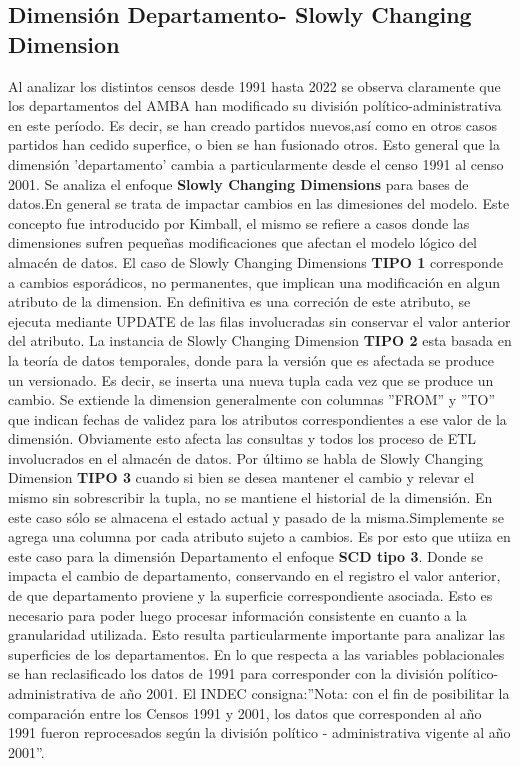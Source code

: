 \documentclass{article}
\theoremstyle{mytheoremstyle}
\theoremstyle{mytheoremstyle}
\theoremstyle{myproblemstyle}
\begin{document}
 \subsection{Dimensión Departamento- Slowly Changing Dimension }
 Al analizar los distintos censos desde 1991 hasta 2022 se observa claramente que los departamentos del 
 AMBA han modificado su división político-administrativa en este período.
  Es decir, se han creado partidos nuevos,así como en otros casos partidos han cedido superfice, o bien se han fusionado otros.
  Esto general que la dimensión 'departamento' cambia a particularmente desde el censo 1991 al censo 2001.\newline
  Se analiza el enfoque \textbf{Slowly Changing Dimensions} para bases de datos.En general se trata de impactar cambios
   en las dimesiones del modelo. Este concepto fue introducido por Kimball, el mismo se
   refiere a casos donde las dimensiones sufren pequeñas modificaciones que afectan el modelo lógico del almacén de datos.\newline
  El caso de Slowly Changing Dimensions \textbf{TIPO 1} corresponde a cambios esporádicos, no permanentes,
   que implican una modificación en algun atributo de la dimension. En definitiva es una correción de este atributo, 
  se ejecuta mediante UPDATE de las filas involucradas sin conservar el valor anterior del atributo.
  La instancia de Slowly Changing Dimension \textbf{TIPO 2} esta basada en la teoría de datos temporales,
   donde para la versión que es afectada se produce un versionado.
  Es decir, se inserta una nueva tupla cada vez que se produce un cambio. Se extiende la dimension generalmente con columnas
   ''FROM'' y ''TO'' que indican  fechas de validez para los atributos correspondientes a ese valor de la dimensión.
    Obviamente esto afecta las consultas y todos los proceso  de ETL involucrados en el almacén de datos. 
  Por último se habla de  Slowly Changing Dimension \textbf{TIPO 3} cuando si bien se desea mantener el cambio y 
  relevar el mismo sin sobrescribir la tupla, no se mantiene el historial de la dimensión.
  En este caso sólo se almacena el estado actual y pasado de la misma.Simplemente se agrega una columna
  por cada atributo sujeto a cambios.\newline
  Es por esto que utiiza en este caso para la dimensión Departamento el enfoque \textbf{SCD tipo 3}. Donde se impacta el 
  cambio de departamento, conservando en el registro el valor anterior, de que departamento proviene y 
  la superficie correspondiente asociada. Esto es necesario para poder luego procesar información consistente 
  en cuanto a la granularidad utilizada. Esto resulta particularmente importante para analizar
  las superficies de los departamentos.\newline
  En lo que respecta a las variables poblacionales se han reclasificado los datos de 1991 para corresponder con la
  división político-administrativa de año 2001. El INDEC consigna:''Nota: con el fin de posibilitar la 
  comparación entre los Censos 1991 y 2001, los datos que 
 corresponden al año 1991 fueron reprocesados según la división político - administrativa
 vigente al año 2001''.\newline
 
\end{document}
